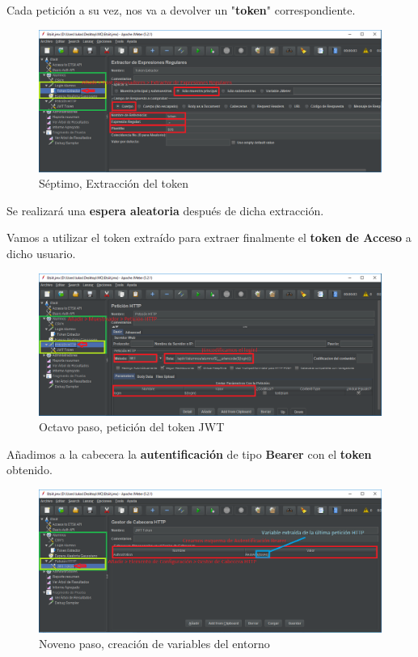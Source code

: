 \documentclass[12pt,a4paper]{article}
\begin{document}
	\newpage
	
	Cada petición a su vez, nos va a devolver un "\textbf{token}" correspondiente.
	
	\begin{figure}[h]
		\centering
		\includegraphics[width=1.0\textwidth]{images/step-7.png}
		\caption{Séptimo, Extracción del token}
	\end{figure}

	Se realizará una \textbf{espera aleatoria} después de dicha extracción.

	Vamos a utilizar el token extraído para extraer finalmente el \textbf{token de Acceso} a dicho usuario.

	\begin{figure}[h]
		\centering
		\includegraphics[width=1.0\textwidth]{images/step-8.png}
		\caption{Octavo paso, petición del token JWT}
	\end{figure}

	\newpage

	Añadimos a la cabecera la \textbf{autentificación} de tipo \textbf{Bearer} con el \textbf{token} obtenido.

	\begin{figure}[h]
		\centering
		\includegraphics[width=1.0\textwidth]{images/step-9.png}
		\caption{Noveno paso, creación de variables del entorno}
	\end{figure}
\end{document}
